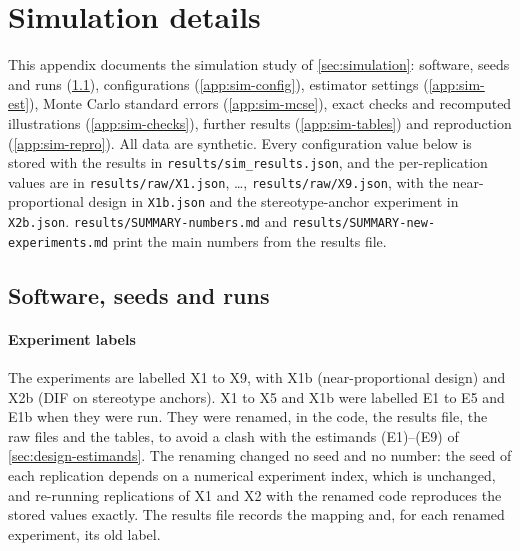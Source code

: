 \section{Simulation details}\label{app:simdetails}

This appendix documents the simulation study of \cref{sec:simulation}: software, seeds and runs (\cref{app:sim-run}), configurations (\cref{app:sim-config}), estimator settings (\cref{app:sim-est}), Monte Carlo standard errors (\cref{app:sim-mcse}), exact checks and recomputed illustrations (\cref{app:sim-checks}), further results (\cref{app:sim-tables}) and reproduction (\cref{app:sim-repro}). All data are synthetic. Every configuration value below is stored with the results in \texttt{results/sim\_results.json}, and the per-replication values are in \texttt{results/raw/X1.json}, \dots, \texttt{results/raw/X9.json}, with the near-proportional design in \texttt{X1b.json} and the stereotype-anchor experiment in \texttt{X2b.json}. \texttt{results/SUMMARY-numbers.md} and \texttt{results/SUMMARY-new-experiments.md} print the main numbers from the results file.

\subsection{Software, seeds and runs}\label{app:sim-run}

\paragraph{Experiment labels}
The experiments are labelled X1 to X9, with X1b (near-proportional design) and X2b (DIF on stereotype anchors). X1 to X5 and X1b were labelled E1 to E5 and E1b when they were run. They were renamed, in the code, the results file, the raw files and the tables, to avoid a clash with the estimands (E1)--(E9) of \cref{sec:design-estimands}. The renaming changed no seed and no number: the seed of each replication depends on a numerical experiment index, which is unchanged, and re-running replications of X1 and X2 with the renamed code reproduces the stored values exactly. The results file records the mapping and, for each renamed experiment, its old label.

